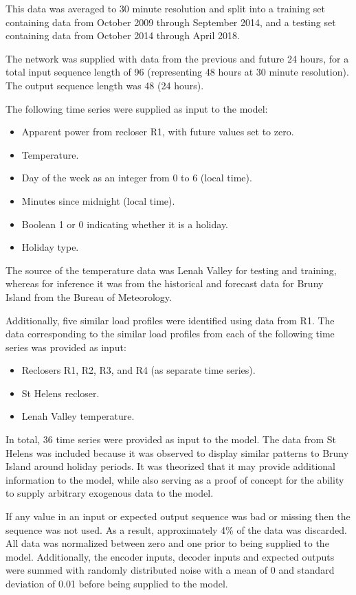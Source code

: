 \documentclass[conference]{IEEEtran}
\begin{document}
This data was averaged to 30 minute resolution and split into a training set containing data from October 2009 through September 2014, and a testing set containing data from October 2014 through April 2018.

The network was supplied with data from the previous and future 24 hours, for a total input sequence length of 96 (representing 48 hours at 30 minute resolution).
The output sequence length was 48 (24 hours).

The following time series were supplied as input to the model:
\begin{itemize}
	\item Apparent power from recloser R1, with future values set to zero.
	\item Temperature.
	\item Day of the week as an integer from 0 to 6 (local time).
	\item Minutes since midnight (local time).
	\item Boolean 1 or 0 indicating whether it is a holiday.
	\item Holiday type.
\end{itemize}

The source of the temperature data was Lenah Valley for testing and training, whereas for inference it was from the historical and forecast data for Bruny Island from the Bureau of Meteorology.

Additionally, five similar load profiles were identified using data from R1.
The data corresponding to the similar load profiles from each of the following time series was provided as input:
\begin{itemize}
	\item Reclosers R1, R2, R3, and R4 (as separate time series).
	\item St Helens recloser.
	\item Lenah Valley temperature.
\end{itemize}

In total, 36 time series were provided as input to the model.
The data from St Helens was included because it was observed to display similar patterns to Bruny Island around holiday periods.
It was theorized that it may provide additional information to the model, while also serving as a proof of concept for the ability to supply arbitrary exogenous data to the model.

If any value in an input or expected output sequence was bad or missing then the sequence was not used.
As a result, approximately 4\% of the data was discarded.
All data was normalized between zero and one prior to being supplied to the model.
Additionally, the encoder inputs, decoder inputs and expected outputs were summed with randomly distributed noise with a mean of 0 and standard deviation of 0.01 before being supplied to the model.
\end{document}

